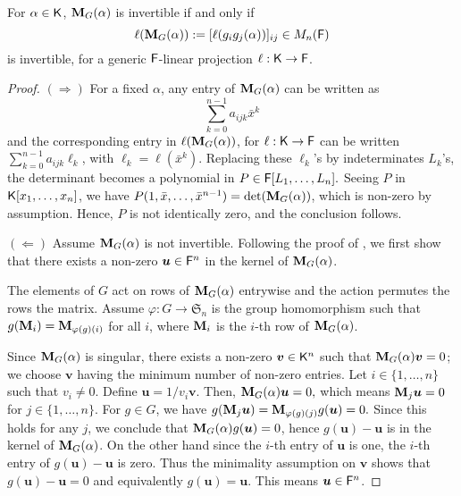 \begin{lemma}\label{Lem:Proj}
  For $\alpha \in {\mathsf{K}}$, $\mat M_G(\alpha)$ is invertible if and only
  if $$\ell(\mat M_G(\alpha)) := [\ell(g_ig_j(\alpha))]_{ij} \in M_n(\F)$$
  is invertible, for a generic ${\mathsf{F}}$-linear projection $\ell: {\mathsf{K}} \to
  {\mathsf{F}}$.
\end{lemma}
\begin{proof}
$(\Rightarrow)$ For a fixed $\alpha$, any entry of $\mat M_G(\alpha)$
  can be written as
\begin{equation}\label{Eq:PrimElm}
\sum_{k= 0}^{n-1} a_{ijk}\bar x^k
\end{equation}
 and the corresponding entry in $\ell(\mat M_G(\alpha))$, for $\ell:
 {\mathsf{K}} \to {\mathsf{F}}$ can be written $\sum_{k= 0}^{n-1} a_{ijk}\ell_k$, with
 $\ell_k = \ell(\bar x^k)$. Replacing these $\ell_k$'s by
 indeterminates $L_k$'s, the determinant becomes a polynomial in $P
 \in {\mathsf{F}}[L_1, \ldots, L_n].$ Seeing $P$ in ${\mathsf{K}}[x_1, \ldots , x_n]$, we
 have $ P(1, \bar x, \ldots, \bar x^{n-1}) = \det(\mat M_G(\alpha))$,
 which is non-zero by assumption. Hence,
 $P$ is not identically zero, and the conclusion follows.
 
 $(\Leftarrow)$ Assume $\mat M_G(\alpha)$ is not invertible. Following
 the proof of \cite[Lemma 4]{Armin}, we first show that there exists a
 non-zero $\boldsymbol{u} \in {\mathsf{F}}^n$ in the kernel of $\mat
 M_G(\alpha)$.

 The elements of $G$ act on rows of $\mat M_G(\alpha)$ entrywise and
 the action permutes the rows the matrix. Assume $\varphi : G \to
 \mathfrak{S}_n$ is the group homomorphism such that $g(\mat M_i) =
 \mat M_{\varphi(g)(i)}$ for all $i$, where $\mat M_i$ is the $i$-th row of $\mat
 M_G(\alpha)$.
 
  Since $\mat M_G(\alpha)$ is singular, there exists a non-zero
  $\boldsymbol{v} \in {\mathsf{K}}^n$ such that $\mat M_G(\alpha)\boldsymbol{v}
  = 0$; we choose $\boldsymbol{v}$ having the minimum number of
  non-zero entries. Let $i \in \lbrace 1, \ldots , n \rbrace$ such
  that $v_i \neq 0$. Define $\boldsymbol{u} =
  1/v_i\boldsymbol{v}$. Then, $\mat M_G(\alpha)\boldsymbol{u} = 0,$
  which means $\mat M_j \boldsymbol{u} = 0 $ for $j \in \lbrace 1,
  \ldots, n \rbrace$. For $g \in G$, we have $g(\mat M_j \boldsymbol{u}) =
  \mat M_{\varphi(g)(j)} g(\boldsymbol{u})= 0.$ Since this holds
  for any $j$, we conclude that $\mat M_G(\alpha)g(\boldsymbol{u})= 0$,  hence
  $g(\boldsymbol{u})-\boldsymbol{u}$ is in the kernel of $\mat M_G(\alpha)$. On the
  other hand since the $i$-th entry of $\boldsymbol{u}$ is one, the $i$-th
  entry of $g(\boldsymbol{u}) -\boldsymbol{u}$ is zero. Thus the minimality
  assumption on $\textbf{v}$ shows that $g(\boldsymbol{u}) -\boldsymbol{u} =
  0$ and equivalently $g(\boldsymbol{u})=\boldsymbol{u}$. This means
  $\boldsymbol{u} \in {\mathsf{F}}^n$.
  

\end{proof}
